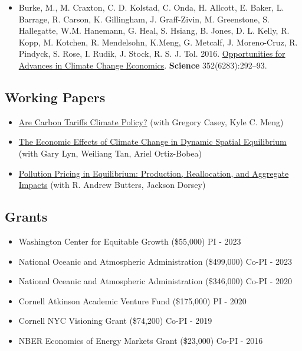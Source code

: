 \documentclass[11pt]{res} %
\begin{document}
\begin{resume}
\begin{itemize}
	\item[]  Burke, M., M. Craxton, C. D. Kolstad, C. Onda, H. Allcott, E. Baker, L. Barrage, R. Carson, K. Gillingham, J. Graff-Zivin, M. Greenstone, S. Hallegatte, W.M. Hanemann, G. Heal, S. Hsiang, B. Jones, D. L. Kelly, R. Kopp, M. Kotchen, R. Mendelsohn, K.Meng, G. Metcalf, J. Moreno-Cruz, R. Pindyck, S. Rose, I. Rudik, J. Stock, R. S. J. Tol. 2016. \href{http://science.sciencemag.org/content/352/6283/292.abstract}{Opportunities for Advances in Climate Change Economics}. \textbf{Science} 352(6283):292--93.
\end{itemize} 


\vspace{-.2in}


\subsection{Working Papers}

\begin{itemize} %
	\item[] \href{https://www.dropbox.com/scl/fi/jqjg9903c2m97kyagmh1r/CaseyMengRudik_carbon_tariffs.pdf?rlkey=vt1jja2dxgrqatmszyr10yajs&dl=1}{Are Carbon Tariffs Climate Policy?} (with Gregory Casey, Kyle C. Meng)
	\item[] \href{https://osf.io/preprints/socarxiv/usghb}{The Economic Effects of Climate Change in Dynamic Spatial Equilibrium} (with Gary Lyn, Weiliang Tan, Ariel Ortiz-Bobea)
	\item[] \href{https://www.nber.org/papers/w35682}{Pollution Pricing in Equilibrium: Production, Reallocation, and Aggregate Impacts} (with R. Andrew Butters, Jackson Dorsey)
\end{itemize}
 
\vspace{-.2in}

\subsection{Grants}
\begin{itemize}  \itemsep -1pt
	\item[] Washington Center for Equitable Growth (\$55,000) \hfill PI - 2023
	\item[] National Oceanic and Atmospheric Administration (\$499,000) \hfill Co-PI - 2023
	\item[] National Oceanic and Atmospheric Administration (\$346,000) \hfill Co-PI - 2020
	\item[] Cornell Atkinson Academic Venture Fund (\$175,000) \hfill PI - 2020
	\item[] Cornell NYC Visioning Grant (\$74,200) \hfill Co-PI - 2019
	\item[] NBER Economics of Energy Markets Grant (\$23,000) \hfill Co-PI - 2016
\end{itemize}


\end{resume}
\end{document}
